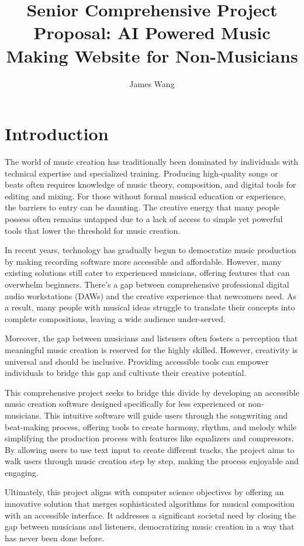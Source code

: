 \documentclass[10pt,twocolumn]{article}
\title{Senior Comprehensive Project Proposal: AI Powered Music Making Website for Non-Musicians}
\author{James Wang}
\affiliation{Occidental College}
\begin{document}
\maketitle

\section{Introduction}

The world of music creation has traditionally been dominated by individuals with technical expertise and specialized training. Producing high-quality songs or beats often requires knowledge of music theory, composition, and digital tools for editing and mixing. For those without formal musical education or experience, the barriers to entry can be daunting. The creative energy that many people possess often remains untapped due to a lack of access to simple yet powerful tools that lower the threshold for music creation.

In recent years, technology has gradually begun to democratize music production by making recording software more accessible and affordable. However, many existing solutions still cater to experienced musicians, offering features that can overwhelm beginners. There's a gap between comprehensive professional digital audio workstations (DAWs) and the creative experience that newcomers need. As a result, many people with musical ideas struggle to translate their concepts into complete compositions, leaving a wide audience under-served.

Moreover, the gap between musicians and listeners often fosters a perception that meaningful music creation is reserved for the highly skilled. However, creativity is universal and should be inclusive. Providing accessible tools can empower individuals to bridge this gap and cultivate their creative potential.

This comprehensive project seeks to bridge this divide by developing an accessible music creation software designed specifically for less experienced or non-musicians. This intuitive software will guide users through the songwriting and beat-making process, offering tools to create harmony, rhythm, and melody while simplifying the production process with features like equalizers and compressors. By allowing users to use text input to create different tracks, the project aims to walk users through music creation step by step, making the process enjoyable and engaging.

Ultimately, this project aligns with computer science objectives by offering an innovative solution that merges sophisticated algorithms for musical composition with an accessible interface. It addresses a significant societal need by closing the gap between musicians and listeners, democratizing music creation in a way that has never been done before.
\end{document}

